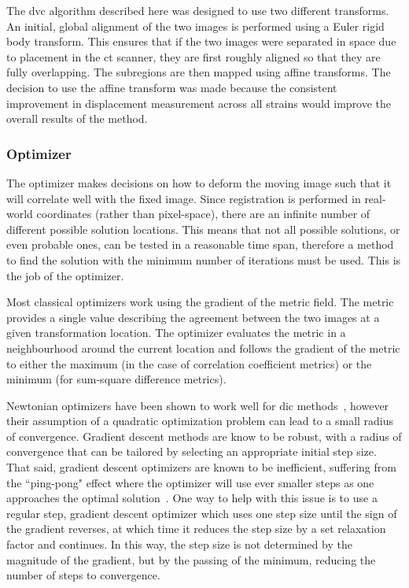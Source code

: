 The \ac{dvc} algorithm described here was designed to use two different transforms.
An initial, global alignment of the two images is performed using a Euler rigid body transform.
This ensures that if the two images were separated in space due to placement in the \ac{ct} scanner, they are first roughly aligned so that they are fully overlapping.
The subregions are then mapped using affine transforms.
The decision to use the affine transform was made because the consistent improvement in displacement measurement across all strains would improve the overall results of the method.


\subsubsection{Optimizer}
\label{sec:dvc_implement_register_optimizer}
The optimizer makes decisions on how to deform the moving image such that it will correlate well with the fixed image.
Since registration is performed in real-world coordinates (rather than pixel-space), there are an infinite number of different possible solution locations.
This means that not all possible solutions, or even probable ones, can be tested in a reasonable time span, therefore a method to find the solution with the minimum number of iterations must be used.
This is the job of the optimizer.

Most classical optimizers work using the gradient of the metric field.
The metric provides a single value describing the agreement between the two images at a given transformation location.
The optimizer evaluates the metric in a neighbourhood around the current location and follows the gradient of the metric to either the maximum (in the case of correlation coefficient metrics) or the minimum (for sum-square difference metrics).

Newtonian optimizers have been shown to work well for \ac{dic} methods~\citep{bing_performance_2006}, however their assumption of a quadratic optimization problem can lead to a small radius of convergence.
Gradient descent methods are know to be robust, with a radius of convergence that can be tailored by selecting an appropriate initial step size.
That said, gradient descent optimizers are known to be inefficient, suffering from the ``ping-pong" effect where the optimizer will use ever smaller steps as one approaches the optimal solution~\citep{meza_steepest_2010}.
One way to help with this issue is to use a regular step, gradient descent optimizer which uses one step size until the sign of the gradient reverses, at which time it reduces the step size by a set relaxation factor and continues.
In this way, the step size is not determined by the magnitude of the gradient, but by the passing of the minimum, reducing the number of steps to convergence.

